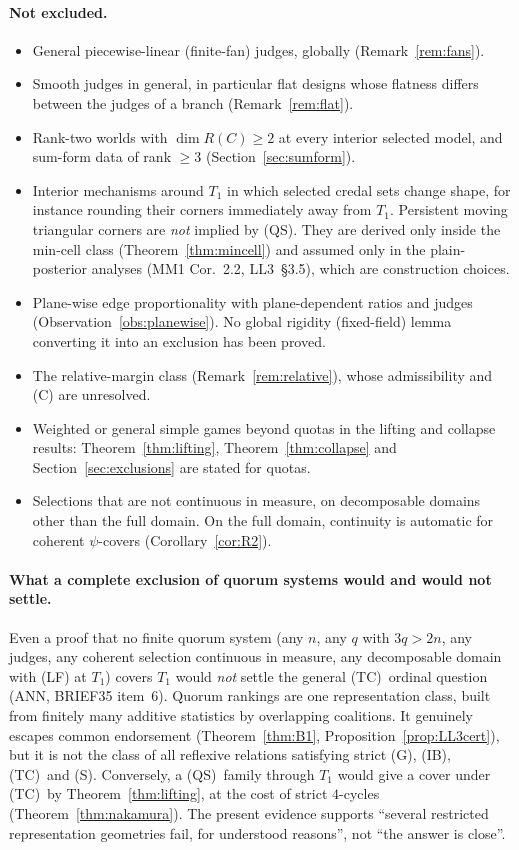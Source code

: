 \documentclass[11pt]{article}
\theoremstyle{definition}
\theoremstyle{remark}
\newcommand{\src}[1]{\textsf{#1}}
\newcommand{\QS}{\textup{(QS)}}
\newcommand{\TC}{\textup{(TC)}}
\begin{document}
\paragraph{Not excluded.}
\begin{itemize}[leftmargin=*]
\item General piecewise-linear (finite-fan) judges, globally (Remark~\ref{rem:fans}).
\item Smooth judges in general, in particular flat designs whose flatness differs between the judges of a branch (Remark~\ref{rem:flat}).
\item Rank-two worlds with $\dim R(C)\ge2$ at every interior selected model, and sum-form data of rank $\ge3$ (Section~\ref{sec:sumform}).
\item Interior mechanisms around $T_1$ in which selected credal sets change shape, for instance rounding their corners immediately away from $T_1$. Persistent moving triangular corners are \emph{not} implied by \QS. They are derived only inside the min-cell class (Theorem~\ref{thm:mincell}) and assumed only in the plain-posterior analyses (\src{MM1} Cor.~2.2, \src{LL3}~\S3.5), which are construction choices.
\item Plane-wise edge proportionality with plane-dependent ratios and judges (Observation~\ref{obs:planewise}). No global rigidity (fixed-field) lemma converting it into an exclusion has been proved.
\item The relative-margin class (Remark~\ref{rem:relative}), whose admissibility and (C) are unresolved.
\item Weighted or general simple games beyond quotas in the lifting and collapse results: Theorem~\ref{thm:lifting}, Theorem~\ref{thm:collapse} and Section~\ref{sec:exclusions} are stated for quotas.
\item Selections that are not continuous in measure, on decomposable domains other than the full domain. On the full domain, continuity is automatic for coherent $\psi$-covers (Corollary~\ref{cor:R2}).
\end{itemize}

\paragraph{What a complete exclusion of quorum systems would and would not settle.} Even a proof that no finite quorum system (any $n$, any $q$ with $3q>2n$, any judges, any coherent selection continuous in measure, any decomposable domain with (LF) at $T_1$) covers $T_1$ would \emph{not} settle the general \TC\ ordinal question (\src{ANN}, \src{BRIEF35} item~6). Quorum rankings are one representation class, built from finitely many additive statistics by overlapping coalitions. It genuinely escapes common endorsement (Theorem~\ref{thm:B1}, Proposition~\ref{prop:LL3cert}), but it is not the class of all reflexive relations satisfying strict (G), (IB), \TC\ and (S). Conversely, a \QS\ family through $T_1$ would give a cover under \TC\ by Theorem~\ref{thm:lifting}, at the cost of strict $4$-cycles (Theorem~\ref{thm:nakamura}). The present evidence supports ``several restricted representation geometries fail, for understood reasons'', not ``the answer is close''.
\end{document}
